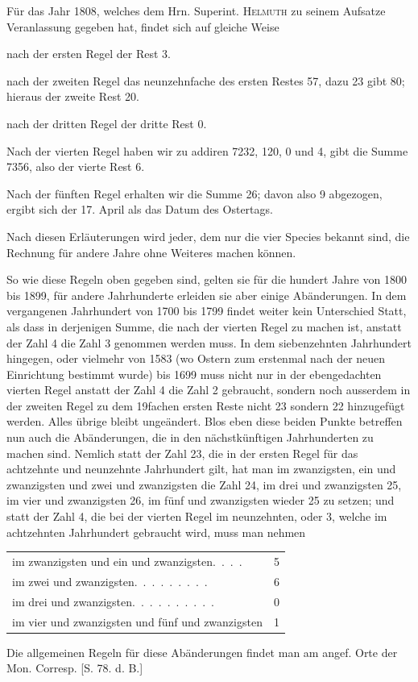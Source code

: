 Für das Jahr 1808, welches dem Hrn. Superint. \textsc{Helmuth} zu seinem Aufsatze
Veranlassung gegeben hat, findet sich auf gleiche Weise

nach der ersten Regel der Rest 3.

nach der zweiten Regel das neunzehnfache des ersten Restes 57, dazu
23 gibt 80; hieraus der zweite Rest 20.

nach der dritten Regel der dritte Rest 0.

Nach der vierten Regel haben wir zu addiren 7232, 120, 0 und 4, gibt
die Summe 7356, also der vierte Rest 6.

Nach der fünften Regel erhalten wir die Summe 26; davon also 9 abgezogen,
ergibt sich der 17. April als das Datum des Ostertags.

Nach diesen Erläuterungen wird jeder, dem nur die vier Species bekannt
sind, die Rechnung für andere Jahre ohne Weiteres machen können.

So wie diese Regeln oben gegeben sind, gelten sie für die hundert Jahre
von 1800 bis 1899, für andere Jahrhunderte erleiden sie aber einige Abänderungen.
In dem vergangenen Jahrhundert von 1700 bis 1799 findet weiter kein
Unterschied Statt, als dass in derjenigen Summe, die nach der vierten Regel zu
machen ist, anstatt der Zahl 4 die Zahl 3 genommen werden muss. In dem
siebenzehnten Jahrhundert hingegen, oder vielmehr von 1583 (wo Ostern zum
erstenmal nach der neuen Einrichtung bestimmt wurde) bis 1699 muss nicht nur
in der ebengedachten vierten Regel anstatt der Zahl 4 die Zahl 2 gebraucht,
sondern noch ausserdem in der zweiten Regel zu dem 19fachen ersten Reste nicht
23 sondern 22 hinzugefügt werden. Alles übrige bleibt ungeändert. Blos eben
diese beiden Punkte betreffen nun auch die Abänderungen, die in den nächstkünftigen
Jahrhunderten zu machen sind. Nemlich statt der Zahl 23, die in der
%
ersten Regel für das achtzehnte und neunzehnte Jahrhundert gilt, hat man im
zwanzigsten, ein und zwanzigsten und zwei und zwanzigsten die Zahl 24, im
drei und zwanzigsten 25, im vier und zwanzigsten 26, im fünf und zwanzigsten
wieder 25 zu setzen; und statt der Zahl 4, die bei der vierten Regel im neunzehnten,
oder 3, welche im achtzehnten Jahrhundert gebraucht wird, muss
man nehmen
\begin{center}\small
\begin{tabular}{lr}
im zwanzigsten und ein und zwanzigsten\quad .\ .\ .\ . &5\\
im zwei und zwanzigsten\quad .\ .\ .\ .\ .\ .\ .\ .\ . &6\\
im drei und zwanzigsten\quad .\ .\ .\ .\ .\ .\ .\ .\ .\ . &0\\
im vier und zwanzigsten und fünf und zwanzigsten &1
\end{tabular}
\end{center}
Die allgemeinen Regeln für diese Abänderungen findet man am angef. Orte
der Mon. Corresp. [S. 78. d. B.]

